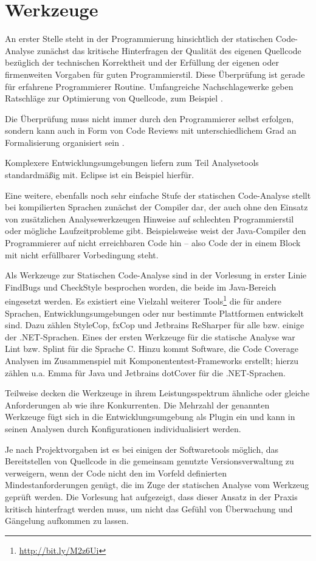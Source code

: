 \section{Werkzeuge}

An erster Stelle steht in der Programmierung hinsichtlich der statischen Code-Analyse zunächst das kritische Hinterfragen der Qualität des eigenen Quellcode bezüglich der technischen Korrektheit und der  Erfüllung der eigenen oder firmenweiten Vorgaben für guten Programmierstil. Diese Überprüfung ist gerade für erfahrene Programmierer Routine. Umfangreiche Nachschlagewerke geben Ratschläge zur Optimierung von Quellcode, zum Beispiel \cite{mcconnell2004}.

Die Überprüfung muss nicht immer durch den Programmierer selbst erfolgen, sondern kann auch in Form von Code Reviews mit unterschiedlichem Grad an Formalisierung organisiert sein \citep{spillner2011}. 

Komplexere Entwicklungsumgebungen liefern zum Teil Analysetools standardmäßig mit. Eclipse ist ein Beispiel hierfür.

Eine weitere, ebenfalls noch sehr einfache Stufe der statischen Code-Analyse stellt bei kompilierten Sprachen zunächst der Compiler dar, der auch ohne den Einsatz von zusätzlichen Analysewerkzeugen Hinweise auf schlechten Programmierstil oder mögliche Laufzeitprobleme gibt. Beispielsweise weist der Java-Compiler den Programmierer auf nicht erreichbaren Code hin -- also Code der in einem Block mit nicht erfüllbarer Vorbedingung steht.


Als Werkzeuge zur Statischen Code-Analyse sind in der Vorlesung in erster Linie FindBugs und CheckStyle besprochen worden, die beide im Java-Bereich eingesetzt werden. Es existiert eine Vielzahl weiterer Tools\footnote{\url{http://bit.ly/M2z6Ui}} die für andere Sprachen, Entwicklungsumgebungen oder nur bestimmte Plattformen entwickelt sind. Dazu zählen StyleCop, fxCop und Jetbrains ReSharper für alle bzw. einige der .NET-Sprachen. Eines der ersten Werkzeuge für die statische Analyse war Lint bzw. Splint für die Sprache C. Hinzu kommt Software, die  Code Coverage Analysen im Zusammenspiel mit Komponententest-Frameworks erstellt; hierzu zählen u.a. Emma für Java und Jetbrains dotCover für die .NET-Sprachen.

Teilweise decken die Werkzeuge in ihrem Leistungsspektrum ähnliche oder gleiche Anforderungen ab wie ihre Konkurrenten. Die Mehrzahl der genannten Werkzeuge fügt sich in die Entwicklungsumgebung als Plugin ein und kann in seinen Analysen durch Konfigurationen individualisiert werden.

Je nach Projektvorgaben ist es bei einigen der Softwaretools möglich, das Bereitstellen von Quellcode in die gemeinsam genutzte Versionsverwaltung zu verweigern, wenn der Code nicht den im Vorfeld definierten Mindestanforderungen genügt, die im Zuge der statischen Analyse vom Werkzeug geprüft werden. Die Vorlesung hat aufgezeigt, dass dieser Ansatz in der Praxis kritisch hinterfragt werden muss, um nicht das Gefühl von Überwachung und Gängelung aufkommen zu lassen.

